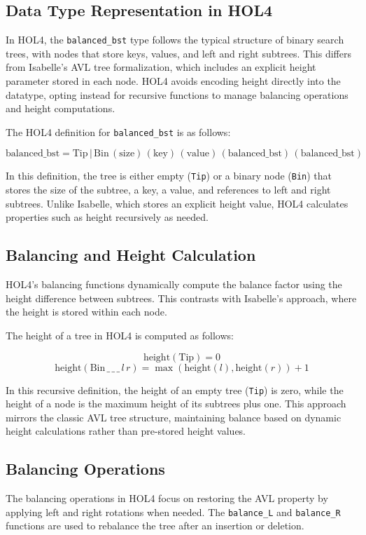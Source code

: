 \subsection{Data Type Representation in HOL4}
In HOL4, the \texttt{balanced\_bst} type follows the typical structure of binary search trees, with nodes that store keys, values, and left and right subtrees. This differs from Isabelle's AVL tree formalization, which includes an explicit height parameter stored in each node. HOL4 avoids encoding height directly into the datatype, opting instead for recursive functions to manage balancing operations and height computations.

The HOL4 definition for \texttt{balanced\_bst} is as follows:

\[
\text{balanced\_bst} = \text{Tip} \, | \, \text{Bin} \, (\text{size}) \, (\text{key}) \, (\text{value}) \, (\text{balanced\_bst}) \, (\text{balanced\_bst})
\]

In this definition, the tree is either empty (\texttt{Tip}) or a binary node (\texttt{Bin}) that stores the size of the subtree, a key, a value, and references to left and right subtrees. Unlike Isabelle, which stores an explicit height value, HOL4 calculates properties such as height recursively as needed.

\subsection{Balancing and Height Calculation}
HOL4’s balancing functions dynamically compute the balance factor using the height difference between subtrees. This contrasts with Isabelle’s approach, where the height is stored within each node.

The height of a tree in HOL4 is computed as follows:

\[
\text{height}(\text{Tip}) = 0
\]
\[
\text{height}(\text{Bin} \, \_ \, \_ \, \_ \, l \, r) = \max(\text{height}(l), \text{height}(r)) + 1
\]

In this recursive definition, the height of an empty tree (\texttt{Tip}) is zero, while the height of a node is the maximum height of its subtrees plus one. This approach mirrors the classic AVL tree structure, maintaining balance based on dynamic height calculations rather than pre-stored height values.

\subsection{Balancing Operations}
The balancing operations in HOL4 focus on restoring the AVL property by applying left and right rotations when needed. The \texttt{balance\_L} and \texttt{balance\_R} functions are used to rebalance the tree after an insertion or deletion.

